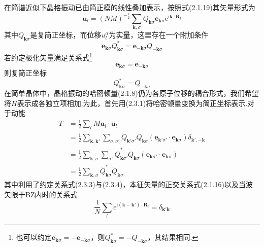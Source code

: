 在简谐近似下晶格振动已由简正模的线性叠加表示，按照式(2.1.19)其矢量形式为
\begin{equation}
  \boldsymbol{u}_l=(NM)^{-\frac{1}{2}}\sum_{\boldsymbol{k},\sigma}
  Q_{\boldsymbol{k}\sigma}\boldsymbol{e}_{\boldsymbol{k}\sigma}
  \mathrm{e}^{\mathrm{i}\boldsymbol{k}\cdot\boldsymbol{R}_l}
\end{equation}
其中$Q_{\boldsymbol{k}\sigma}$是复简正坐标，而位移$u_l^{\alpha}$为实量，这里存在一个附加条件
\begin{equation}
  \boldsymbol{e}_{\boldsymbol{k}\sigma}Q_{\boldsymbol{k}\sigma}^{*}
  =\boldsymbol{e}_{-\boldsymbol{k}\sigma}Q_{-\boldsymbol{k}\sigma}
\end{equation}
若约定极化矢量满足关系式\footnote{也可以约定$\boldsymbol{e}_{\boldsymbol{k}\sigma}=-\boldsymbol{e}_{-\boldsymbol{k}\sigma}$，则$Q_{\boldsymbol{k}\sigma}^{*}=-Q_{-\boldsymbol{k}\sigma}$，其结果相同.}
\begin{equation}
  \boldsymbol{e}_{\boldsymbol{k}\sigma}=\boldsymbol{e}_{-\boldsymbol{k}\sigma}
\end{equation}
则复简正坐标
\begin{equation}
  Q_{\boldsymbol{k}\sigma}^{*}=Q_{-\boldsymbol{k}\sigma}
\end{equation}
在简单晶体中，晶格振动的哈密顿量(2.1.8)仍为各原子位移的耦合形式，我们希望将$H$表示成各独立项相加.为此，首先用(2.3.1)将哈密顿量变换为简正坐标表示.对于动能
\begin{equation}
\begin{aligned}
  T&=\frac{1}{2}\sum_l M\dot{\boldsymbol{u}}_l\cdot\dot{\boldsymbol{u}}_l\\
  &=\frac{1}{2}\sum_{\boldsymbol{k},\boldsymbol{k}'}\sum_{\sigma,\sigma'}
  \dot{Q}_{\boldsymbol{k}'\sigma'}\dot{Q}_{\boldsymbol{k}\sigma}
  (\boldsymbol{e}_{\boldsymbol{k}'\sigma'}\cdot\boldsymbol{e}_{\boldsymbol{k}\sigma})
  \delta_{\boldsymbol{k}',-\boldsymbol{k}}\\
  &=\frac{1}{2}\sum_{\boldsymbol{k},\sigma}\sum_{\sigma'}
  \dot{Q}_{\boldsymbol{k}\sigma'}^{*}\dot{Q}_{\boldsymbol{k}\sigma}
  (\boldsymbol{e}_{\boldsymbol{k}\sigma'}\cdot\boldsymbol{e}_{\boldsymbol{k}\sigma})\\
  &=\frac{1}{2}\sum_{\boldsymbol{k},\sigma}\dot{Q}_{\boldsymbol{k}\sigma}^{*}\dot{Q}_{\boldsymbol{k}\sigma}
\end{aligned}
\end{equation}
其中利用了约定关系式(2.3.3)与(2.3.4)，本征矢量的正交关系式(2.1.16)以及当波矢限于BZ内时的关系式
\begin{equation*}
  \frac{1}{N}\sum_l\mathrm{e}^{\mathrm{i}(\boldsymbol{k}-\boldsymbol{k}')\cdot\boldsymbol{R}_l}
  =\delta_{\boldsymbol{k}'\boldsymbol{k}}
\end{equation*}
